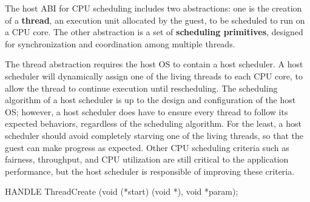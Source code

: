 \label{sec:abi:thread}

The host ABI for CPU scheduling includes two abstractions:
one is the creation of a {\bf thread}, an execution unit allocated by the guest,
to be scheduled to run on a CPU core.
The other abstraction is a set of {\bf scheduling primitives},
designed for synchronization and coordination
among multiple threads.



The thread abstraction requires the host OS to contain a host scheduler.
A host scheduler will dynamically assign one of the living threads to each CPU core, to allow the thread to continue execution until rescheduling.
The scheduling algorithm of a host scheduler is up to
the design and configuration of the host OS;
however, a host scheduler does have to ensure every thread to follow its expected behaviors,
regardless of the scheduling algorithm.
For the least, a host scheduler should avoid completely starving one of the living threads,
so that the guest can make progress as expected.
Other CPU scheduling criteria such as fairness, throughput, and CPU utilization
are still critical to the application performance, but the host scheduler is responsible of improving these criteria.











\begin{paldef}
HANDLE ThreadCreate (void (*start) (void *),
                     void *param);
\end{paldef}


